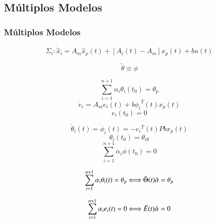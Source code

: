 \documentclass[aspectratio=169]{beamer}
\begin{document}
\subsection{Múltiplos Modelos}
\begin{frame}
\frametitle{Múltiplos Modelos}

\begin{equation}
\Sigma_i: \dot{\hat{x}}_i = A_m\hat{x}_p(t) + [A_i(t)-A_m]x_p(t) +bu(t)
\end{equation}

\begin{equation}
\tilde{\theta} \equiv \phi
\end{equation}

\end{frame}

\begin{frame}

\centering
\begin{minipage}{.48\textwidth}
  \centering
\begin{equation}
\sum_{i=1}^{n+1}\alpha_i\theta_i(t_0) = \theta_p
\end{equation}
\begin{equation}
\dot{e}_i = A_m e_i(t) + b{\phi_i}^T(t)x_p(t)
\end{equation}
\begin{equation}
e_i(t_0)=0
\end{equation}
\end{minipage}%
  \hfill
\begin{minipage}{.48\textwidth}
  \centering

\begin{equation}
\dot{\theta}_i(t) = \dot{\phi}_i(t) = -{e_i}^T(t)Pbx_p(t)
\end{equation}
\begin{equation}
\theta_i(t_0) = \theta_{i0}
\end{equation}
\begin{equation}
\sum_{i=1}^{n+1}\alpha_i\phi(t_0)=0 
\end{equation}
\end{minipage}


\end{frame}


\begin{frame}

\centering
\begin{minipage}{.48\textwidth}
  \centering
  \begin{equation}
  \sum_{i=1}^{n+1}\alpha_i\theta_i(t) = \theta_p \Longleftrightarrow \bar{\Theta}(t)\bar{\alpha} = \theta_p \space 
  \end{equation}
\end{minipage}%
  \hfill

\begin{minipage}{.48\textwidth}
  \centering
    \begin{equation}
    \sum_{i=1}^{n+1}\alpha_i e_i(t) = 0 \Longleftrightarrow \bar{E}(t)\bar{\alpha} = 0 \space
    \end{equation}
\end{minipage}

\end{frame}
\end{document}
